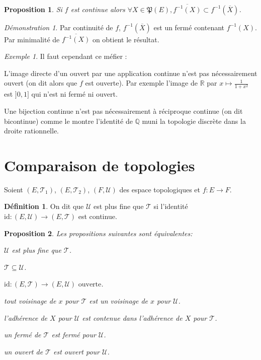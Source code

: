 \documentclass[a4paper, 11pt, french]{book}
\newenvironment{itemise}{\itemize}{\enditemize}
\theoremstyle{plain} %
\newtheorem{proposition}{Proposition}
\theoremstyle{definition} %
\newtheorem{definition}{Définition}
\theoremstyle{remark} %
\newtheorem{exemple}{Exemple}
\newtheorem*{demonstration}{Démonstration}
\newcommand{\1}{\mathds{1}}
\newcommand{\id}{\mathrm{id}}
\newcommand{\inv}[1]{#1^{-1}}
\newcommand{\Q}{\mathbb{Q}}
\newcommand{\R}{\mathbb{R}}
\renewcommand{\frak}[1]{\mathfrak{#1}}
\newcommand{\scr}[1]{\mathscr{#1}}
\begin{document}
\begin{proposition}
	Si $f$ est continue alors $\forall X\in\frak{P}(E), \overline{\inv{f}(X)}\subset\inv{f}(\overline{X})$.
\end{proposition}

\begin{demonstration}
	Par continuité de $f$, $\inv{f}(\overline{X})$ est un fermé contenant $\inv{f}(X)$.
	Par minimalité de $\overline{\inv{f}(X)}$ on obtient le résultat.
\end{demonstration}

\begin{exemple}
	Il faut cependant ce méfier :
	\begin{itemise}
		\item L'image directe d'un ouvert par une application continue n'est pas nécessairement ouvert (on dit alors que $f$ est ouverte).
		Par exemple l'image de $\R$ par $x\mapsto\frac{1}{1+x^2}$ est $]0,1]$ qui n'est ni fermé ni ouvert.
		\item Une bijection continue n'est pas nécessairement à réciproque continue (on dit bicontinue) comme le montre l'identité de $\Q$ muni la topologie discrète dans la droite rationnelle.
	\end{itemise}
\end{exemple}

\section{Comparaison de topologies}

Soient $(E, \scr{T}_1)$, $(E, \scr{T}_2)$, $(F, \scr{U})$ des espace topologiques et $f\colon E\rightarrow F$.

\begin{definition}
	On dit que $\scr{U}$ est plus fine que $\scr{T}$ si l'identité $\id\colon(E, \scr{U})\rightarrow(E, \scr{T})$ est continue.
\end{definition}

\begin{proposition}
	Les propositions suivantes sont équivalentes:
	\begin{itemise}
		\item $\scr{U}$ est plus fine que $\scr{T}$.
		\item $\scr{T}\subseteq\scr{U}$.
		\item $\id\colon(E, \scr{T})\rightarrow(E, \scr{U})\text{ ouverte}$.
		\item tout voisinage de $x$ pour $\scr{T}$ est un voisinage de $x$ pour $\scr{U}$.
		\item l'adhérence de $X$ pour $\scr{U}$ est contenue dans l'adhérence de $X$ pour $\scr{T}$.
		\item un fermé de $\scr{T}$ est fermé pour $\scr{U}$.
		\item un ouvert de $\scr{T}$ est ouvert pour $\scr{U}$.
	\end{itemise}
\end{proposition}
\end{document}
